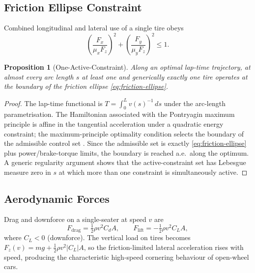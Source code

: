 \documentclass[11pt,twocolumn]{article}
\newtheorem{proposition}[theorem]{Proposition}
\theoremstyle{definition}
\theoremstyle{remark}
\begin{document}
\subsection{Friction Ellipse Constraint}

Combined longitudinal and lateral use of a single tire obeys \cite{milliken1995race,guiggiani2014science}
\begin{equation}
\left(\frac{F_x}{\mu_x F_z}\right)^2 + \left(\frac{F_y}{\mu_y F_z}\right)^2 \le 1. \label{eq:friction-ellipse}
\end{equation}

\begin{proposition}[One-Active-Constraint]\label{prop:one-active}
Along an optimal lap-time trajectory, at almost every arc length $s$ at least one and generically exactly one tire operates at the boundary of the friction ellipse \eqref{eq:friction-ellipse}.
\end{proposition}

\begin{proof}
The lap-time functional is $T = \int_0^L v(s)^{-1}\,ds$ under the arc-length parametrisation. The Hamiltonian associated with the Pontryagin maximum principle \cite{pontryagin1962mathematical,bryson1975applied,kirk2012optimal} is affine in the tangential acceleration under a quadratic energy constraint; the maximum-principle optimality condition selects the boundary of the admissible control set \cite{aftalion2014train,perantoni2014optimal}. Since the admissible set is exactly \eqref{eq:friction-ellipse} plus power/brake-torque limits, the boundary is reached a.e.\ along the optimum. A generic regularity argument shows that the active-constraint set has Lebesgue measure zero in $s$ at which more than one constraint is simultaneously active.
\end{proof}

\subsection{Aerodynamic Forces}

Drag and downforce on a single-seater at speed $v$ are \cite{katz2006aerodynamics,anderson2010aerodynamics,hoerner1965fluid,schlichting2017boundary}
\begin{equation}
F_{\mathrm{drag}} = \tfrac{1}{2}\rho v^2 C_d A, \qquad F_{\mathrm{lift}} = -\tfrac{1}{2}\rho v^2 C_L A,
\end{equation}
where $C_L < 0$ (downforce). The vertical load on tires becomes $F_z(v) = mg + \tfrac{1}{2}\rho v^2 |C_L| A$, so the friction-limited lateral acceleration rises with speed, producing the characteristic high-speed cornering behaviour of open-wheel cars.
\end{document}

